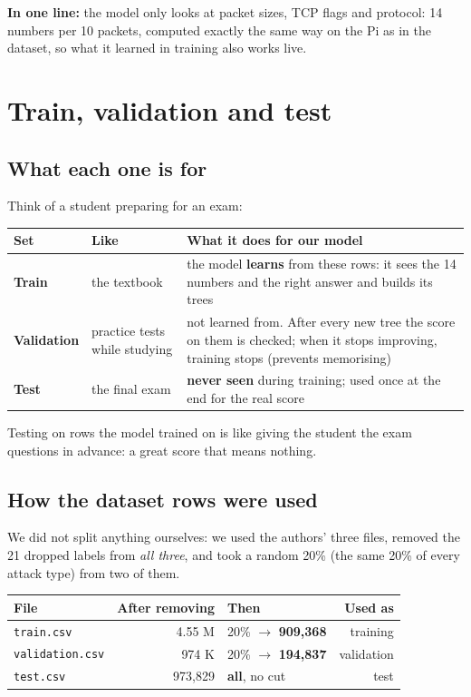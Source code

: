 \documentclass[11pt,a4paper]{article}
\newcommand{\file}[1]{\texttt{\small #1}}
\newcommand{\keybox}[1]{\par\smallskip\noindent\colorbox{accent!8}{\parbox{\dimexpr\linewidth-2\fboxsep}{\vspace{0.5em}#1\vspace{0.5em}}}\par\medskip}
\newcommand{\tablestart}{\Needspace{8\baselineskip}}
\begin{document}
\keybox{\textbf{In one line:} the model only looks at packet sizes, TCP flags and protocol: 14 numbers per 10
packets, computed exactly the same way on the Pi as in the dataset, so what it learned in training also works live.}

\section{Train, validation and test}

\subsection{What each one is for}

Think of a student preparing for an exam:

\tablestart
\begin{center}
\begin{tabularx}{\linewidth}{P{2.3cm}P{3.3cm}L}
\toprule
Set & Like & What it does for our model \\
\midrule
\textbf{Train} & the textbook & the model \textbf{learns} from these rows: it sees the 14 numbers and the right
answer and builds its trees \\
\textbf{Validation} & practice tests while studying & not learned from. After every new tree the score on them is
checked; when it stops improving, training stops (prevents memorising) \\
\textbf{Test} & the final exam & \textbf{never seen} during training; used once at the end for the real score \\
\bottomrule
\end{tabularx}
\end{center}

Testing on rows the model trained on is like giving the student the exam questions in advance: a great score that
means nothing.

\subsection{How the dataset rows were used}

We did not split anything ourselves: we used the authors' three files, removed the 21 dropped labels from
\emph{all three}, and took a random 20\% (the same 20\% of every attack type) from two of them.

\tablestart
\begin{center}
\begin{tabular}{lrlr}
\toprule
File & After removing & Then & Used as \\
\midrule
\file{train.csv} & 4.55 M & 20\% $\rightarrow$ \textbf{909,368} & training \\
\file{validation.csv} & 974 K & 20\% $\rightarrow$ \textbf{194,837} & validation \\
\file{test.csv} & 973,829 & \textbf{all}, no cut & test \\
\bottomrule
\end{tabular}
\end{center}
\end{document}
